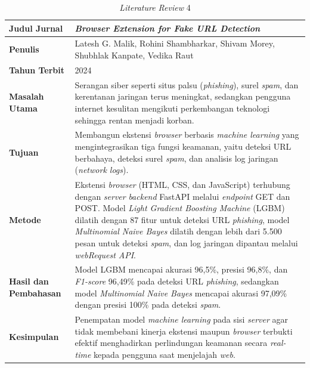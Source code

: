\documentclass[12pt,a4paper,twoside]{report}
\begin{document}
\clearpage
\begin{table}[H]
  \centering
  \caption{\textit{Literature Review} 4}
  \label{tab:sota4}
  \begin{spacing}{1.15}
  \normalsize
  \begin{tabular}{|L{119.5pt}|L{251.5pt}|}
    \hline
    \textbf{Judul Jurnal} & \textit{Browser Extension for Fake URL Detection} \\ \hline
    \textbf{Penulis} & Latesh G. Malik, Rohini Shambharkar, Shivam Morey, Shubhlak Kanpate, Vedika Raut \\ \hline
    \textbf{Tahun Terbit} & 2024 \\ \hline
    \textbf{Masalah Utama} & Serangan siber seperti situs palsu (\textit{phishing}), surel \textit{spam}, dan kerentanan jaringan terus meningkat, sedangkan pengguna internet kesulitan mengikuti perkembangan teknologi sehingga rentan menjadi korban. \\ \hline
    \textbf{Tujuan} & Membangun ekstensi \textit{browser} berbasis \textit{machine learning} yang mengintegrasikan tiga fungsi keamanan, yaitu deteksi URL berbahaya, deteksi surel \textit{spam}, dan analisis log jaringan (\textit{network logs}). \\ \hline
    \textbf{Metode} & Ekstensi \textit{browser} (HTML, CSS, dan JavaScript) terhubung dengan \textit{server} \textit{backend} FastAPI melalui \textit{endpoint} GET dan POST. Model \textit{Light Gradient Boosting Machine} (LGBM) dilatih dengan 87 fitur untuk deteksi URL \textit{phishing}, model \textit{Multinomial Naive Bayes} dilatih dengan lebih dari 5.500 pesan untuk deteksi \textit{spam}, dan log jaringan dipantau melalui \textit{webRequest API}. \\ \hline
    \textbf{Hasil dan Pembahasan} & Model LGBM mencapai akurasi 96,5\%, presisi 96,8\%, dan \textit{F1-score} 96,49\% pada deteksi URL \textit{phishing}, sedangkan model \textit{Multinomial Naive Bayes} mencapai akurasi 97,09\% dengan presisi 100\% pada deteksi \textit{spam}. \\ \hline
    \textbf{Kesimpulan} & Penempatan model \textit{machine learning} pada sisi \textit{server} agar tidak membebani kinerja ekstensi maupun \textit{browser} terbukti efektif menghadirkan perlindungan keamanan secara \textit{real-time} kepada pengguna saat menjelajah \textit{web}. \\ \hline
  \end{tabular}
  \end{spacing}
\end{table}
\end{document}
